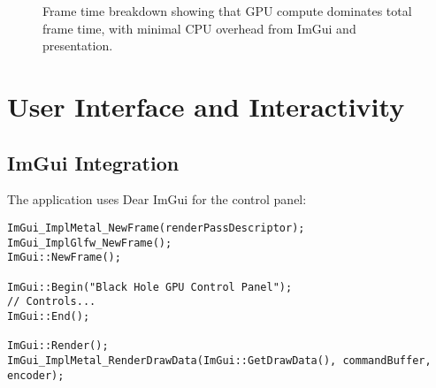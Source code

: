 \documentclass[12pt,a4paper]{article}
\theoremstyle{definition}
\theoremstyle{remark}
\begin{document}
\begin{figure}[H]
    \centering
    \caption{Frame time breakdown showing that GPU compute dominates total frame time, with minimal CPU overhead from ImGui and presentation.}
    \label{fig:frame_time_breakdown}
\end{figure}

\section{User Interface and Interactivity}

\subsection{ImGui Integration}

The application uses Dear ImGui for the control panel:

\begin{lstlisting}[style=metalstyle, caption=ImGui window setup]
ImGui_ImplMetal_NewFrame(renderPassDescriptor);
ImGui_ImplGlfw_NewFrame();
ImGui::NewFrame();

ImGui::Begin("Black Hole GPU Control Panel");
// Controls...
ImGui::End();

ImGui::Render();
ImGui_ImplMetal_RenderDrawData(ImGui::GetDrawData(), commandBuffer, encoder);
\end{lstlisting}
\end{document}
